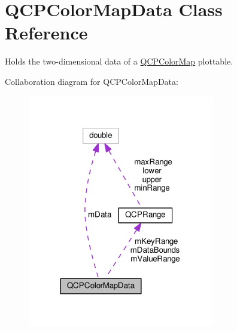 \hypertarget{classQCPColorMapData}{}\section{Q\+C\+P\+Color\+Map\+Data Class Reference}
\label{classQCPColorMapData}


Holds the two-\/dimensional data of a \hyperlink{classQCPColorMap}{Q\+C\+P\+Color\+Map} plottable.  




Collaboration diagram for Q\+C\+P\+Color\+Map\+Data\+:
\nopagebreak
\begin{figure}[H]
\begin{center}
\leavevmode
\includegraphics[width=231pt]{classQCPColorMapData__coll__graph}
\end{center}
\end{figure}

